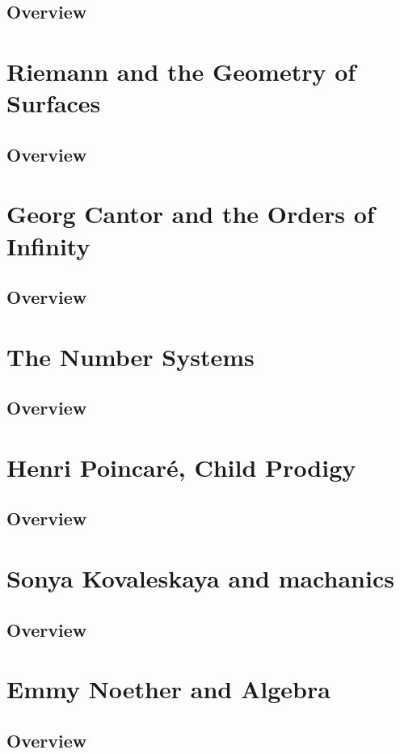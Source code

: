 \documentclass{article}
\begin{document}
\subsection{Overview}%
\label{sub:Overview}
\section{Riemann and the Geometry of Surfaces}
\subsection{Overview}%
\label{sub:Overview}
\section{Georg Cantor and the Orders of Infinity}
\subsection{Overview}%
\label{sub:Overview}
\section{The Number Systems}
\subsection{Overview}%
\label{sub:Overview}
\section{Henri Poincaré, Child Prodigy}
\subsection{Overview}%
\label{sub:Overview}
\section{Sonya Kovaleskaya and machanics}
\subsection{Overview}%
\label{sub:Overview}
\section{Emmy Noether and Algebra}
\subsection{Overview}%
\label{sub:Overview}
\end{document}
